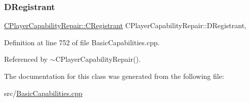 \subsubsection{\texorpdfstring{D\+Registrant}{DRegistrant}}
{\footnotesize\ttfamily \hyperlink{classCPlayerCapabilityRepair_1_1CRegistrant}{C\+Player\+Capability\+Repair\+::\+C\+Registrant} C\+Player\+Capability\+Repair\+::\+D\+Registrant\hspace{0.3cm}{\ttfamily [static]}, {\ttfamily [protected]}}



Definition at line 752 of file Basic\+Capabilities.\+cpp.



Referenced by $\sim$\+C\+Player\+Capability\+Repair().



The documentation for this class was generated from the following file\+:\begin{DoxyCompactItemize}
\item 
src/\hyperlink{BasicCapabilities_8cpp}{Basic\+Capabilities.\+cpp}\end{DoxyCompactItemize}
